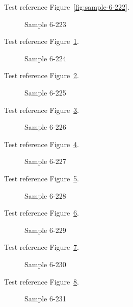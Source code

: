 Test reference Figure~\ref{fig:sample-6-222}.

\begin{figure}[tbhp]
\caption{Sample 6-223}
\label{fig:sample-6-223}
\end{figure}

Test reference Figure~\ref{fig:sample-6-223}.

\begin{figure}[tbhp]
\caption{Sample 6-224}
\label{fig:sample-6-224}
\end{figure}

Test reference Figure~\ref{fig:sample-6-224}.

\begin{figure}[tbhp]
\caption{Sample 6-225}
\label{fig:sample-6-225}
\end{figure}

Test reference Figure~\ref{fig:sample-6-225}.

\begin{figure}[tbhp]
\caption{Sample 6-226}
\label{fig:sample-6-226}
\end{figure}

Test reference Figure~\ref{fig:sample-6-226}.

\begin{figure}[tbhp]
\caption{Sample 6-227}
\label{fig:sample-6-227}
\end{figure}

Test reference Figure~\ref{fig:sample-6-227}.

\begin{figure}[tbhp]
\caption{Sample 6-228}
\label{fig:sample-6-228}
\end{figure}

Test reference Figure~\ref{fig:sample-6-228}.

\begin{figure}[tbhp]
\caption{Sample 6-229}
\label{fig:sample-6-229}
\end{figure}

Test reference Figure~\ref{fig:sample-6-229}.

\begin{figure}[tbhp]
\caption{Sample 6-230}
\label{fig:sample-6-230}
\end{figure}

Test reference Figure~\ref{fig:sample-6-230}.

\begin{figure}[tbhp]
\caption{Sample 6-231}
\label{fig:sample-6-231}
\end{figure}


